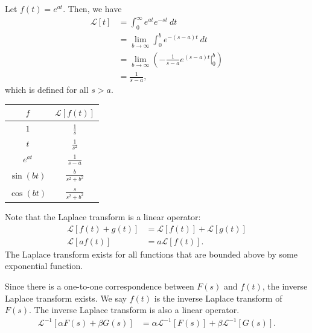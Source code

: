 \documentclass[10pt]{mypackage}
\begin{document}
\begin{example}
  Let $f(t) = e^{at}$. Then, we have
  \begin{align*}
    \mathcal{L}\left[t\right] &= \int_{0}^{\infty} e^{at}e^{-st}\:dt\\
                              &= \lim_{b\rightarrow\infty}\int_{0}^{b} e^{-\left(s-a\right)t}\:dt\\
                              &= \lim_{b\rightarrow\infty}\left(-\frac{1}{s-a}e^{\left(s-a\right)t}\bigr\vert_{0}^{b}\right)\\
                              &= \frac{1}{s-a},
  \end{align*}
  which is defined for all $s > a$.
\end{example}
\begin{center}
  \renewcommand{\arraystretch}{1.75}
  \begin{tabular}{c|c}
    $f$ & $\mathcal{L}\left[f(t)\right]$\\
    \hline
    $1$ & $\displaystyle\frac{1}{s} $\\
    $t$ & $\displaystyle\frac{1}{s^2} $\\
    $e^{at}$ & $\displaystyle\frac{1}{s-a} $\\
    $\sin\left(bt\right)$ & $\displaystyle\frac{b}{s^2 + b^2} $\\
    $\cos\left(bt\right)$ & $\displaystyle\frac{s}{s^2 + b^2} $
  \end{tabular}
\end{center}
Note that the Laplace transform is a linear operator:
\begin{align*}
  \mathcal{L}\left[f(t) + g(t)\right] &= \mathcal{L}\left[f(t)\right] + \mathcal{L}\left[g(t)\right]\\
  \mathcal{L}\left[af(t)\right] &= a\mathcal{L}\left[f(t)\right].
\end{align*}
The Laplace transform exists for all functions that are bounded above by some exponential function.\newline

Since there is a one-to-one correspondence between $F(s)$ and $f(t)$, the inverse Laplace transform exists. We say $f(t)$ is the inverse Laplace transform of $F(s)$. The inverse Laplace transform is also a linear operator.
\begin{align*}
  \mathcal{L}^{-1}\left[\alpha F(s) + \beta G(s)\right] &= \alpha \mathcal{L}^{-1}\left[F(s)\right] + \beta \mathcal{L}^{-1}\left[G(s)\right].
\end{align*}
\end{document}
